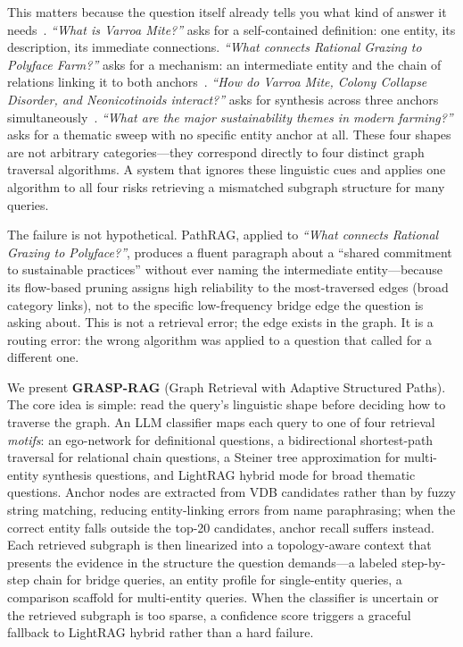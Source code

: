 This matters because the question itself already tells you what kind of
answer it needs~\cite{li2002learning}.
\textit{``What is Varroa Mite?''} asks for a self-contained definition: one
entity, its description, its immediate connections.
\textit{``What connects Rational Grazing to Polyface Farm?''} asks for a
mechanism: an intermediate entity and the chain of relations linking it to
both anchors~\cite{yang2018hotpotqa}.
\textit{``How do Varroa Mite, Colony Collapse Disorder, and Neonicotinoids
interact?''} asks for synthesis across three anchors simultaneously~\cite{ho2020constructing}.
\textit{``What are the major sustainability themes in modern farming?''} asks
for a thematic sweep with no specific entity anchor at all.
These four shapes are not arbitrary categories---they correspond directly to
four distinct graph traversal algorithms.
A system that ignores these linguistic cues and applies one algorithm to all
four risks retrieving a mismatched subgraph structure for many queries.

The failure is not hypothetical.
PathRAG, applied to
\textit{``What connects Rational Grazing to Polyface?''}, produces a
fluent paragraph about a ``shared commitment to sustainable practices''
without ever naming the intermediate entity---because its flow-based pruning
assigns high reliability to the most-traversed edges (broad category links),
not to the specific low-frequency bridge edge the question is asking about.
This is not a retrieval error; the edge exists in the graph.
It is a routing error: the wrong algorithm was applied to a question that
called for a different one.

We present \textbf{GRASP-RAG} (Graph Retrieval with Adaptive Structured
Paths).
The core idea is simple: read the query's linguistic shape before deciding
how to traverse the graph.
An LLM classifier maps each query to one of four retrieval \emph{motifs}:
an ego-network for definitional questions, a bidirectional shortest-path
traversal for relational chain questions, a Steiner tree approximation for
multi-entity synthesis questions, and LightRAG hybrid mode for broad
thematic questions.
Anchor nodes are extracted from VDB candidates rather than by fuzzy string
matching, reducing entity-linking errors from name paraphrasing; when the
correct entity falls outside the top-20 candidates, anchor recall suffers
instead.
Each retrieved subgraph is then linearized into a topology-aware context
that presents the evidence in the structure the question demands---a labeled
step-by-step chain for bridge queries, an entity profile for single-entity
queries, a comparison scaffold for multi-entity queries.
When the classifier is uncertain or the retrieved subgraph is too sparse, a
confidence score triggers a graceful fallback to LightRAG hybrid rather than
a hard failure.

